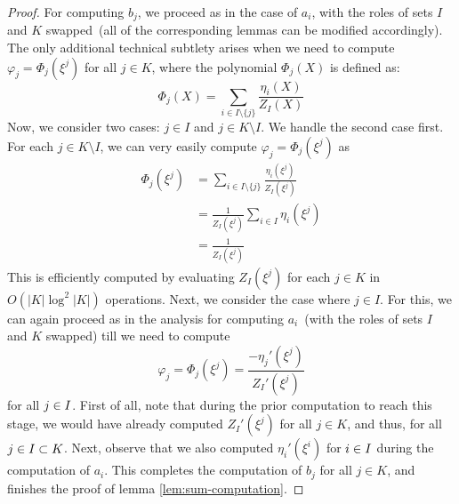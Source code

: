 \begin{proof}
	 For computing $b_j$, we proceed as in the case of $a_i$, with the roles of sets $I$ and $K$ swapped~(all of the corresponding lemmas can be modified accordingly). The only additional technical subtlety arises when we need to compute $\varphi_j=\Phi_j(\xi^j)$ for all $j \in K$, where the polynomial $\Phi_j(X)$ is defined as:
	\[\Phi_j(X)=\sum_{i\in I\setminus \{j\}} \frac{\eta_i(X)}{Z_I(X)}\] 
%    
%    
%
%
	Now, we consider two cases: $j\in I$ and $j\in K \setminus I$. We handle the second case first. For each $j \in K\setminus I$, we can very easily compute $\varphi_j=\Phi_j(\xi^j)$ as
    \begin{align*}
        \Phi_j(\xi^j)&=\sum_{i\in I\setminus \{j\}} \frac{\eta_i(\xi^j)}{Z_I(\xi^j)}\\
        &=\frac{1}{Z_I(\xi^j)} \sum_{i\in I}\eta_i(\xi^j)\\
        &=\frac{1}{Z_I(\xi^j)}
    \end{align*}
	This is efficiently computed by evaluating $Z_I(\xi^j)$ for each $j\in K$ in $O(|K|\log^2|K|)$ operations. Next, we consider the case where $j\in I$. For this, we can again proceed as in the analysis for computing $a_i$~(with the roles of sets $I$ and $K$ swapped) till we need to compute 
%
%
    $$\varphi_j =\Phi_j(\xi^j) = \frac{-\eta_j'(\xi^j)}{Z_I'(\xi^j)}$$
    for all $j \in I$. First of all, note that during the prior computation to reach this stage, we would have already computed $Z_I'(\xi^j)$ for all $j\in K$, and thus, for all $j\in I\subset K$.  
	Next, observe that we also computed $\eta_i'(\xi^i)$ for $i\in I$ during the computation of $a_i$.
    This completes the computation of $b_j$ for all $j \in K$, and finishes the proof of lemma \ref{lem:sum-computation}.
\end{proof}


